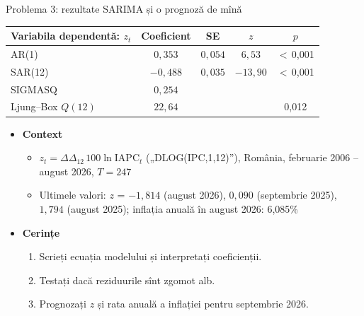 \begin{frame}{Problema 3: rezultate SARIMA și o prognoză de mînă}
\itemsize{\footnotesize}
\begin{center}
\scriptsize
\begin{tabular}{lcccc}
\toprule
\textbf{Variabila dependentă: $z_t$} & Coeficient & SE & $z$ & $p$ \\
\midrule
AR(1) & $0{,}353$ & $0{,}054$ & $6{,}53$ & $<$\,0{,}001 \\
SAR(12) & $\ensuremath{-}0{,}488$ & $0{,}035$ & $\ensuremath{-}13{,}90$ & $<$\,0{,}001 \\
SIGMASQ & $0{,}254$ & & & \\
Ljung--Box $Q(12)$ & $22{,}64$ & & & 0{,}012 \\
\bottomrule
\end{tabular}
\end{center}
\begin{itemize}
    \item \textbf{Context}
    \begin{itemize}
        \item $z_t = \Delta\Delta_{12}\,100\ln \mathrm{IAPC}_t$ („DLOG(IPC,1,12)”), România, februarie 2006 -- august 2026, $T = 247$
        \item Ultimele valori: $z$ = $\ensuremath{-}1{,}814$ (august 2026), $0{,}090$ (septembrie 2025), $1{,}794$ (august 2025); inflația anuală în august 2026: 6{,}085\%
    \end{itemize}
    \item \textbf{Cerințe}
\begin{enumerate}
    \item Scrieți ecuația modelului și interpretați coeficienții.
    \item Testați dacă reziduurile sînt zgomot alb.
    \item Prognozați $z$ și rata anuală a inflației pentru septembrie 2026.
\end{enumerate}
\end{itemize}
\end{frame}

